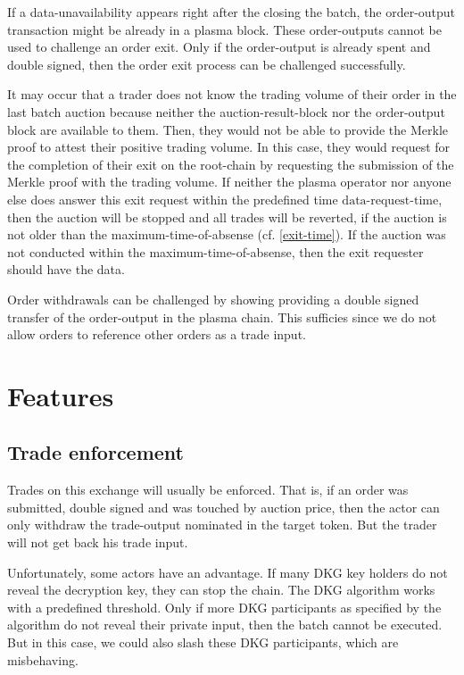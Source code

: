 \documentclass[11pt,parskip=full]{scrartcl}%
\begin{document}
If a data-unavailability appears right after the closing the batch, the order-output transaction might be already in a plasma block. 
These order-outputs cannot be used to challenge an order exit. 
Only if the order-output is already spent and double signed, then the order exit process can be challenged successfully. 

It may occur that a trader does not know the trading volume of their order in the last batch auction because neither the auction-result-block nor the order-output block are available to them. 
Then, they would not be able to provide the Merkle proof to attest their positive trading volume. 
In this case, they would request for the completion of their exit on the root-chain by requesting the submission of the Merkle proof with the trading volume. 
If neither the plasma operator nor anyone else does answer this exit request within the predefined time $\text{data-request-time}$, then the auction will be stopped and all trades will be reverted, if the auction is not older than the maximum-time-of-absense (cf. \ref{exit-time}). If the auction was not conducted within the maximum-time-of-absense, then the exit requester should have the data.

Order withdrawals can be challenged by showing providing a double signed transfer of the order-output in the plasma chain. This sufficies since we do not allow orders to reference other orders as a trade input.

\newpage

\section{Features}

\subsection{Trade enforcement}
Trades on this exchange will usually be enforced. 
That is, if an order was submitted, double signed and was touched by auction price, then the actor can only withdraw the trade-output nominated in the target token. 
But the trader will not get back his trade input. 

Unfortunately, some actors have an advantage.
If many DKG key holders do not reveal the decryption key, they can stop the chain. 
The DKG algorithm works with a predefined threshold. 
Only if more DKG participants as specified by the algorithm do not reveal their private input, then the batch cannot be executed. 
But in this case, we could also slash these DKG participants, which are misbehaving. 
\end{document}
